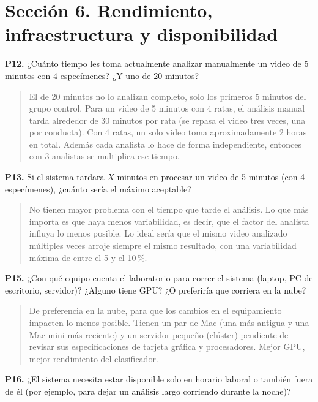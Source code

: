 \section*{Sección 6. Rendimiento, infraestructura y disponibilidad}

\textbf{P12.} ¿Cuánto tiempo les toma actualmente analizar manualmente un video de
5 minutos con 4 especímenes? ¿Y uno de 20 minutos?

\begin{quote}
El de 20 minutos no lo analizan completo, solo los primeros 5 minutos del grupo
control. Para un video de 5 minutos con 4 ratas, el análisis manual tarda alrededor
de 30 minutos por rata (se repasa el video tres veces, una por conducta). Con 4 ratas,
un solo video toma aproximadamente 2 horas en total. Además cada analista lo hace de
forma independiente, entonces con 3 analistas se multiplica ese tiempo.
\end{quote}

\textbf{P13.} Si el sistema tardara $X$ minutos en procesar un video de 5 minutos
(con 4 especímenes), ¿cuánto sería el máximo aceptable?

\begin{quote}
No tienen mayor problema con el tiempo que tarde el análisis. Lo que más importa es
que haya menos variabilidad, es decir, que el factor del analista influya lo menos
posible. Lo ideal sería que el mismo video analizado múltiples veces arroje siempre
el mismo resultado, con una variabilidad máxima de entre el 5 y el 10\,\%.
\end{quote}

\textbf{P15.} ¿Con qué equipo cuenta el laboratorio para correr el sistema (laptop,
PC de escritorio, servidor)? ¿Alguno tiene GPU? ¿O preferiría que corriera en la nube?

\begin{quote}
De preferencia en la nube, para que los cambios en el equipamiento impacten lo menos
posible. Tienen un par de Mac (una más antigua y una Mac mini más reciente) y un
servidor pequeño (clúster) pendiente de revisar sus especificaciones de tarjeta gráfica
y procesadores. Mejor GPU, mejor rendimiento del clasificador.
\end{quote}

\textbf{P16.} ¿El sistema necesita estar disponible solo en horario laboral o también
fuera de él (por ejemplo, para dejar un análisis largo corriendo durante la noche)?

